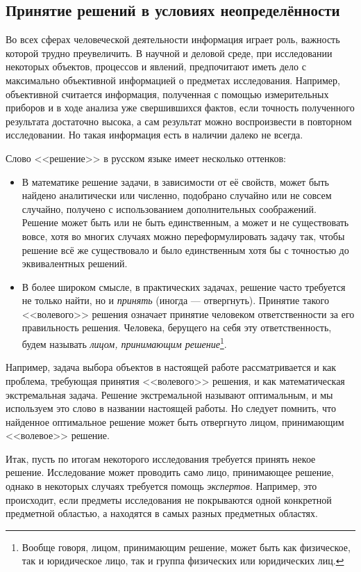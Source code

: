
\subsection{Принятие решений в условиях неопределённости}
\label{sec:basic_intro}

Во всех сферах человеческой деятельности информация играет роль, важность которой трудно преувеличить. В научной и деловой среде, при исследовании некоторых объектов, процессов и явлений,  предпочитают иметь дело с максимально объективной информацией о предметах исследования. Например, объективной считается информация, полученная с помощью измерительных приборов и в ходе анализа уже свершившихся фактов, если точность полученного результата достаточно высока, а сам результат можно воспроизвести в повторном исследовании. Но такая информация есть в наличии далеко не всегда.

Слово <<решение>> в русском языке имеет несколько оттенков: 
\begin{itemize}
  \item В математике решение задачи, в зависимости от её свойств, может быть найдено аналитически или численно, подобрано случайно или не совсем случайно, получено с использованием дополнительных соображений. Решение может быть или не быть единственным, а может и не существовать вовсе,  хотя во многих случаях можно переформулировать задачу так, чтобы решение всё же существовало и было единственным хотя бы с точностью до эквивалентных решений. 
  \item В более широком смысле, в практических задачах, решение часто требуется не только найти, но и {\sl принять} (иногда --- отвергнуть). Принятие такого <<волевого>> решения означает принятие человеком ответственности за его правильность решения. Человека, берущего на себя эту ответственность, будем называть {\sl лицом, принимающим решение}\footnote{Вообще говоря, лицом, принимающим решение, может быть как физическое, так и юридическое лицо, так и группа физических или юридических лиц.}. 
\end{itemize}
Например, задача выбора объектов в настоящей работе рассматривается и как проблема, требующая принятия <<волевого>> решения, и как математическая экстремальная задача. Решение экстремальной называют оптимальным, и мы используем это слово в названии настоящей работы. Но следует помнить, что найденное оптимальное решение может быть отвергнуто лицом, принимающим <<волевое>> решение.

Итак, пусть по итогам некоторого исследования требуется принять некое решение. Исследование может проводить само лицо, принимающее решение, однако в некоторых случаях требуется помощь {\sl экспертов}. Например, это происходит,  если предметы исследования не покрываются одной конкретной предметной областью, а находятся в самых разных предметных областях.  

